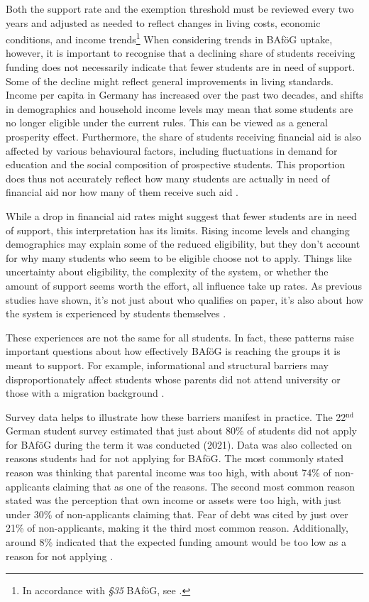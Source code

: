 Both the support rate and the exemption threshold must be reviewed every two years and adjusted as needed to reflect changes in living costs, economic conditions, and income trends\footnote{
    In accordance with \textit{§35} BAföG, see \cite{bafoeg_law}.
}
When considering trends in BAföG uptake, however, it is important to recognise that a declining share of students receiving funding does not necessarily indicate that fewer students are in need of support. 
Some of the decline might reflect general improvements in living standards. 
Income per capita in Germany has increased over the past two decades, and shifts in demographics and household income levels may mean that some students are no longer eligible under the current rules. 
This can be viewed as a general prosperity effect. 
Furthermore, the share of students receiving financial aid is also affected by various behavioural factors, including fluctuations in demand for education and the social composition of prospective students. 
This proportion does thus not accurately reflect how many students are actually in need of financial aid nor how many of them receive such aid \citep{meier_bafog_2024, meier_zur_2024}.

While a drop in financial aid rates might suggest that fewer students are in need of support, this interpretation has its limits. Rising income levels and changing demographics may explain some of the reduced eligibility, but they don't account for why many students who seem to be eligible choose not to apply. Things like uncertainty about eligibility, the complexity of the system, or whether the amount of support seems worth the effort, all influence take up rates. As previous studies have shown, it’s not just about who qualifies on paper, it’s also about how the system is experienced by students themselves \citep{meier_bafog_2024, meier_zur_2024}.

These experiences are not the same for all students. In fact, these patterns raise important questions about how effectively BAföG is reaching the groups it is meant to support. For example, informational and structural barriers may disproportionately affect students whose parents did not attend university or those with a migration background \citep{kroher_studierendenbefragung_2023}.

Survey data helps to illustrate how these barriers manifest in practice. The 22\( ^\text{nd} \) German student survey estimated that just about 80\% of students did not apply for BAföG during the term it was conducted (2021). Data was also collected on reasons students had for not applying for BAföG. The most commonly stated reason was thinking that parental income was too high, with about 74\% of non-applicants claiming that as one of the reasons. The second most common reason stated was the perception that own income or assets were too high, with just under 30\% of non-applicants claiming that. Fear of debt was cited by just over 21\% of non-applicants, making it the third most common reason. Additionally, around 8\% indicated that the expected funding amount would be too low as a reason for not applying \citep{kroher_studierendenbefragung_2023}.

